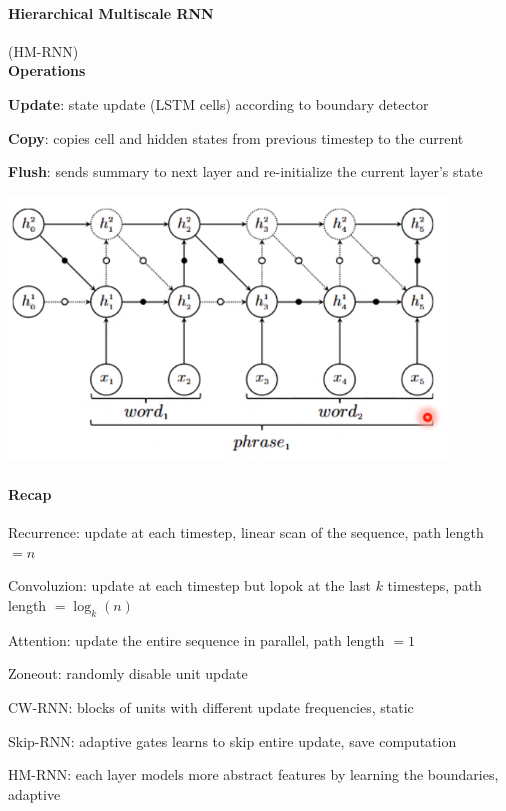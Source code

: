 \documentclass[10pt]{report}
\begin{document}
\paragraph{Hierarchical Multiscale RNN} (HM-RNN)\\
\textbf{Operations}\begin{list}{}{}
	\item \textbf{Update}: state update (LSTM cells) according to boundary detector
	\item \textbf{Copy}: copies cell and hidden states from previous timestep to the current
	\item \textbf{Flush}: sends summary to next layer and re-initialize the current layer's state
\end{list}
\begin{center}
	\includegraphics[scale=0.5]{126.png}
\end{center}
\paragraph{Recap}\begin{list}{}{}
	\item Recurrence: update at each timestep, linear scan of the sequence, path length $=n$
	\item Convoluzion: update at each timestep but lopok at the last $k$ timesteps, path length $=\log_k(n)$
	\item Attention: update the entire sequence in parallel, path length $=1$
	\item Zoneout: randomly disable unit update
	\item CW-RNN: blocks of units with different update frequencies, static
	\item Skip-RNN: adaptive gates learns to skip entire update, save computation
	\item HM-RNN: each layer models more abstract features by learning the boundaries, adaptive
\end{list}
\pagebreak
\end{document}
